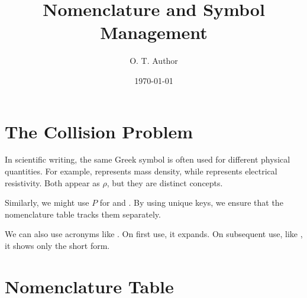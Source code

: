 \documentclass{otbook}
\title{Nomenclature and Symbol Management}
\author{O. T. Author}
\date{\today}
\begin{document}
\makeotbooktitle

\chapter{The Collision Problem}

In scientific writing, the same Greek symbol is often used for different physical quantities. For example,  represents mass density, while  represents electrical resistivity. Both appear as $\rho$, but they are distinct concepts.

Similarly, we might use $P$ for  and . By using unique keys, we ensure that the nomenclature table tracks them separately.

We can also use acronyms like . On first use, it expands. On subsequent use, like , it shows only the short form.

\chapter{Nomenclature Table}

\end{document}
